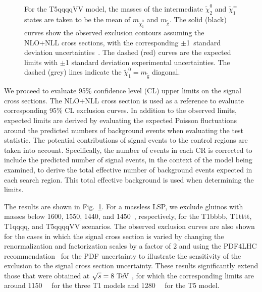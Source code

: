 \begin{figure}[htbp]
{      For the T5qqqqVV model,
      the masses of the intermediate $\tilde{\chi}^{0}_{2}$ and $\tilde{\chi}^{\pm}_{1}$  states
      are taken to be the mean of $m_{\tilde{\chi}^{0}_{1}}$ and $m_{\tilde{\text{g}}}$.
      The solid (black) curves show the observed exclusion contours
      assuming the NLO+NLL cross
      sections, with the corresponding $\pm$1~standard
      deviation uncertainties~\cite{Borschensky:2014cia}.
      The dashed (red) curves are the expected limits
      with $\pm$1 standard deviation experimental uncertainties.
      The dashed (grey) lines indicate the $\tilde{\chi}^{0}_{1}=m_{\tilde{\text{g}}}$ diagonal.
    }
    \label{fig:limits}
\end{figure}

We proceed to evaluate 95\% confidence level (CL) upper limits
on the signal cross sections.
The NLO+NLL cross section is used as a reference
to evaluate corresponding 95\% CL exclusion curves.
In addition to the observed limits,
expected limits are derived by evaluating the
expected Poisson fluctuations around the predicted
numbers of background events when evaluating the test statistic.
The potential contributions of signal events to the control regions
are taken into account.
Specifically,
the number of events in each CR is corrected
to include the predicted number of signal events,
in the context of the model being examined,
to derive the total effective number of background events
expected in each search region.
This total effective background is used when determining the limits.

The results are shown in Fig.~\ref{fig:limits}. 
For a massless LSP,
we exclude gluinos with masses below 1600, 1550, 1440, and 1450~\GeV,
respectively,
for the T1bbbb, T1tttt, T1qqqq, and T5qqqqVV scenarios. The observed exclusion curves are also shown for the cases in which the signal cross section is varied by changing the renormalization and factorization scales by a factor of 2 and using the PDF4LHC recommendation~\cite{Botje:2011sn} for the PDF uncertainty to illustrate the sensitivity of the exclusion to the signal cross section uncertainty.
These results significantly extend those that were
obtained at $\sqrt{s}=8~\text{TeV}~$,
for which the corresponding limits are around
1150~\GeV~\cite{Chatrchyan:2013wxa,Chatrchyan:2014lfa} for the
three T1 models and 1280~\GeV~\cite{Chatrchyan:2014lfa} for the T5 model.
